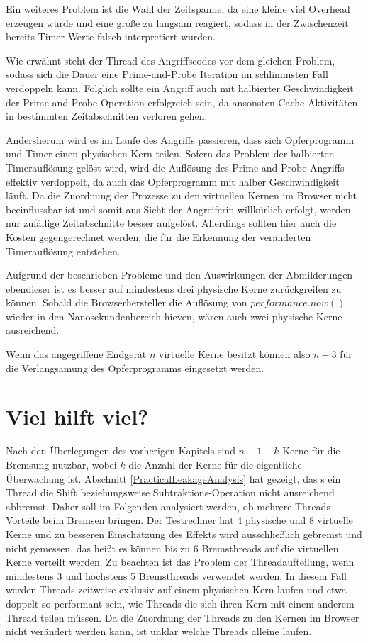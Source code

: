Ein weiteres Problem ist die Wahl der Zeitspanne, da eine kleine viel Overhead erzeugen würde und eine große zu langsam reagiert, sodass in der Zwischenzeit bereits Timer-Werte falsch interpretiert wurden.

Wie erwähnt steht der Thread des Angriffscodes vor dem gleichen Problem, sodass sich die Dauer eine Prime-and-Probe Iteration im schlimmsten Fall verdoppeln kann.
Folglich sollte ein Angriff auch mit halbierter Geschwindigkeit der Prime-and-Probe Operation erfolgreich sein, da ansonsten Cache-Aktivitäten in bestimmten Zeitabschnitten verloren gehen.

Andersherum wird es im Laufe des Angriffs passieren, dass sich Opferprogramm und Timer einen physischen Kern teilen.
Sofern das Problem der halbierten Timerauflösung gelöst wird, wird die Auflösung des Prime-and-Probe-Angriffs effektiv verdoppelt, da auch das Opferprogramm mit halber Geschwindigkeit läuft.
Da die Zuordnung der Prozesse zu den virtuellen Kernen im Browser nicht beeinflussbar ist und somit aus Sicht der Angreiferin willkürlich erfolgt, werden nur zufällige Zeitabschnitte besser aufgelöst.
Allerdings sollten hier auch die Kosten gegengerechnet werden, die für die Erkennung der veränderten Timerauflösung entstehen.

Aufgrund der beschrieben Probleme und den Auswirkungen der Abmilderungen ebendieser ist es besser auf mindestens drei physische Kerne zurückgreifen zu können.
Sobald die Browserhersteller die Auflösung von $performance.now()$ wieder in den Nanosekundenbereich hieven, wären auch zwei physische Kerne ausreichend. 

Wenn das angegriffene Endgerät $n$ virtuelle Kerne besitzt können also $n-3$ für die Verlangsamung des Opferprogramms eingesetzt werden.

\section{Viel hilft viel?}

Nach den Überlegungen des vorherigen Kapitels sind $n-1-k$ Kerne für die Bremsung nutzbar, wobei $k$ die Anzahl der Kerne für die eigentliche Überwachung ist. Abschnitt \ref{PracticalLeakageAnalysis} hat gezeigt, das s ein Thread die Shift beziehungsweise Subtraktions-Operation nicht ausreichend abbremst.
Daher soll im Folgenden analysiert werden, ob mehrere Threads Vorteile beim Bremsen bringen.
Der Testrechner hat 4 physische und 8 virtuelle Kerne und zu besseren Einschätzung des Effekts wird ausschließlich gebremst und nicht gemessen, das heißt es können bis zu 6 Bremsthreads auf die virtuellen Kerne verteilt werden.
Zu beachten ist das Problem der Threadaufteilung, wenn mindestens 3 und höchstens 5 Bremsthreads verwendet werden.
In diesem Fall werden Threads zeitweise exklusiv auf einem physischen Kern laufen und etwa doppelt so performant sein, wie Threads die sich ihren Kern mit einem anderem Thread teilen müssen.
Da die Zuordnung der Threads zu den Kernen im Browser nicht verändert werden kann, ist unklar welche Threads alleine laufen.

